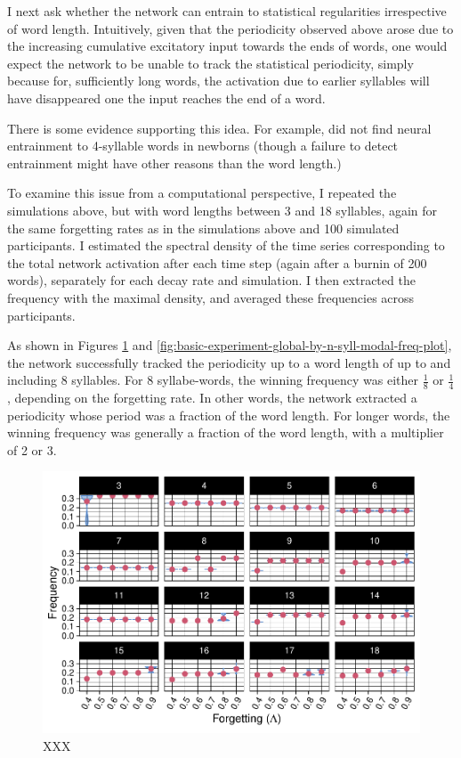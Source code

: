 \documentclass[
]{article}
\begin{document}
I next ask whether the network can entrain to statistical regularities
irrespective of word length. Intuitively, given that the periodicity
observed above arose due to the increasing cumulative excitatory input
towards the ends of words, one would expect the network to be unable to
track the statistical periodicity, simply because for, sufficiently long
words, the activation due to earlier syllables will have disappeared one
the input reaches the end of a word.

There is some evidence supporting this idea. For example,
\citep{Benjamin2023} did not find neural entrainment to 4-syllable words
in newborns (though a failure to detect entrainment might have other
reasons than the word length.)

To examine this issue from a computational perspective, I repeated the
simulations above, but with word lengths between 3 and 18 syllables,
again for the same forgetting rates as in the simulations above and 100
simulated participants. I estimated the spectral density of the time
series corresponding to the total network activation after each time
step (again after a burnin of 200 words), separately for each decay rate
and simulation. I then extracted the frequency with the maximal density,
and averaged these frequencies across participants.

As shown in Figures
\ref{fig:basic-experiment-global-by-n-syll-create-freq-plot} and
\ref{fig:basic-experiment-global-by-n-syll-modal-freq-plot}, the network
successfully tracked the periodicity up to a word length of up to and
including 8 syllables. For 8 syllabe-words, the winning frequency was
either \(\frac{1}{8}\) or \(\frac{1}{4}\), depending on the forgetting
rate. In other words, the network extracted a periodicity whose period
was a fraction of the word length. For longer words, the winning
frequency was generally a fraction of the word length, with a multiplier
of 2 or 3.

\begin{figure}
\includegraphics[width=1\linewidth]{tp_model_entrainment_files/figure-latex/basic-experiment-global-by-n-syll-create-freq-plot-1} \caption{XXX}\label{fig:basic-experiment-global-by-n-syll-create-freq-plot}
\end{figure}
\end{document}
